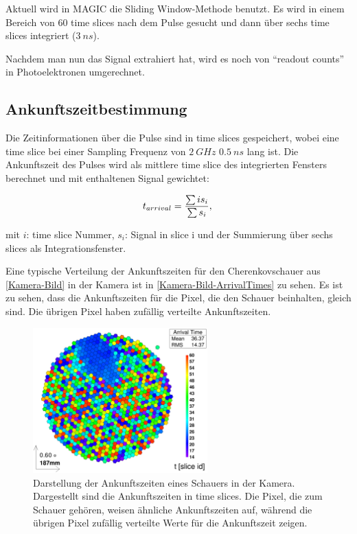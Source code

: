Aktuell wird in MAGIC die Sliding Window-Methode benutzt. 
Es wird in einem Bereich von 60 time slices  nach dem Pulse gesucht und dann über sechs time slices integriert ($\SI{3}{ns}$).

Nachdem man nun das Signal extrahiert hat, wird es noch von ``readout counts'' in Photoelektronen umgerechnet.

\subsection{Ankunftszeitbestimmung}
Die Zeitinformationen über die Pulse sind in time slices gespeichert, wobei eine time slice bei einer Sampling Frequenz von $\SI{2}{GHz}$ $\SI{0,5}{ns}$ lang ist.
Die Ankunftszeit des Pulses wird als mittlere time slice des integrierten Fensters berechnet und mit enthaltenen Signal gewichtet:

\begin{equation}
 t_{arrival}=\frac{\sum i s_i}{\sum s_i},\\
\end{equation}
\begin{center}
\small{mit $i$: time slice Nummer, $s_i$: Signal in slice i und der Summierung über sechs slices als Integrationsfenster.}
\end{center}


Eine typische Verteilung der Ankunftszeiten für den Cherenkovschauer aus \autoref{Kamera-Bild} in der Kamera ist in \autoref{Kamera-Bild-ArrivalTimes} zu sehen.
Es ist zu sehen, dass die Ankunftszeiten für die Pixel, die den Schauer beinhalten, gleich sind.
Die übrigen Pixel haben zufällig verteilte Ankunftszeiten.

\begin{figure}
    \centering
    \includegraphics[width=0.6\textwidth]{./Plots/03_MonteCarlos/Signal_ArrivalTime_fertig.png}
    \caption{Darstellung der Ankunftszeiten eines Schauers in der Kamera. Dargestellt sind die Ankunftszeiten in time slices.
    Die Pixel, die zum Schauer gehören, weisen ähnliche Ankunftszeiten auf, während die übrigen Pixel zufällig verteilte Werte für die Ankunftszeit zeigen.}
    \label{Kamera-Bild-ArrivalTimes}
\end{figure}

